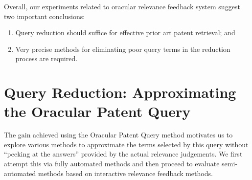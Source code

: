 Overall, our experiments related to oracular relevance feedback system
suggest two important conclusions: 
\begin{enumerate}
\item Query reduction should suffice for effective prior art patent retrieval; and 
\item Very precise methods for eliminating poor query terms in the reduction process are required.
\end{enumerate}

%

\section{Query Reduction: Approximating the Oracular Patent Query}
The gain achieved using the Oracular Patent Query method motivates us to explore various methods to approximate the terms
selected by this query without ``peeking at the answers'' provided by
the actual relevance judgements.  We first attempt this via fully
automated methods and then proceed to evaluate semi-automated methods
based on interactive relevance feedback methods.
